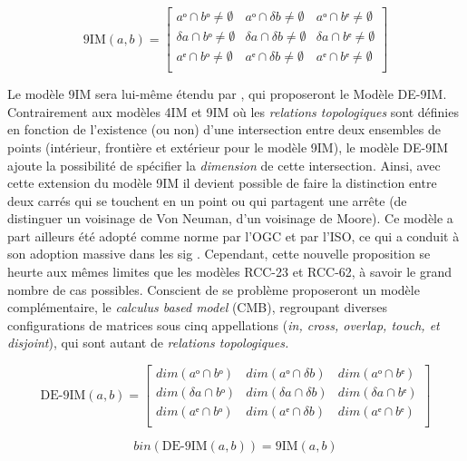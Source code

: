 \begin{equation}
  \label{eq:matrice_9IM}
  \text{9IM}(a,b) =
  \begin{bmatrix}
    aᵒ ∩ bᵒ ≠ ∅ & aᵒ ∩ δb ≠ ∅ & aᵒ ∩ bᵉ ≠ ∅ \\
    δa ∩ bᵒ ≠ ∅ & δa ∩ δb ≠ ∅ & δa ∩ bᵉ ≠ ∅ \\
    aᵉ ∩ bᵒ ≠ ∅ & aᵉ ∩ δb ≠ ∅ & aᵉ ∩ bᵉ ≠ ∅ \\
  \end{bmatrix}
\end{equation}


Le modèle 9IM sera lui-même étendu par \textcite{Clementini1993}, qui
proposeront le Modèle DE-9IM. Contrairement aux modèles 4IM et 9IM où
les \emph{relations topologiques} sont définies en fonction de
l’existence (ou non) d'une intersection entre deux ensembles de points
(intérieur, frontière et extérieur pour le modèle 9IM), le modèle
DE-9IM ajoute la possibilité de spécifier la \emph{dimension} de cette
intersection. Ainsi, avec cette extension du modèle 9IM il devient
possible de faire la distinction entre deux carrés qui se touchent en
un point ou qui partagent une arrête (\ie de distinguer un voisinage
de Von Neuman, d'un voisinage de Moore).  Ce modèle a part ailleurs
été adopté comme norme par l'OGC et par l'ISO, ce qui a conduit à son
adoption massive dans les \ac{sig} \autocite{Duchene2019}. Cependant,
cette nouvelle proposition se heurte aux mêmes limites que les modèles
RCC-23 et RCC-62, à savoir le grand nombre de cas possibles. Conscient
de se problème \textcite{Clementini1993} proposeront un modèle
complémentaire, le \emph{calculus based model} (CMB), regroupant
diverses configurations de matrices sous cinq appellations (\emph{in,
  cross, overlap, touch, et disjoint}), qui sont autant de
\emph{relations topologiques.}

\begin{equation}
  \label{eq:matrice_DE9IM}
  \text{DE-9IM}(a,b) =
  \begin{bmatrix}
    dim(aᵒ ∩ bᵒ) & dim(aᵒ ∩ δb) & dim(aᵒ ∩ bᵉ)\\
    dim(δa ∩ bᵒ) & dim(δa ∩ δb) & dim(δa ∩ bᵉ)\\
    dim(aᵉ ∩ bᵒ) & dim(aᵉ ∩ δb) & dim(aᵉ ∩ bᵉ)\\
  \end{bmatrix}
\end{equation}

\begin{equation}
  \label{eq:DE9IM_to_9IM}
  bin(\text{DE-9IM}(a,b)) = \text{9IM}(a,b)
\end{equation}


